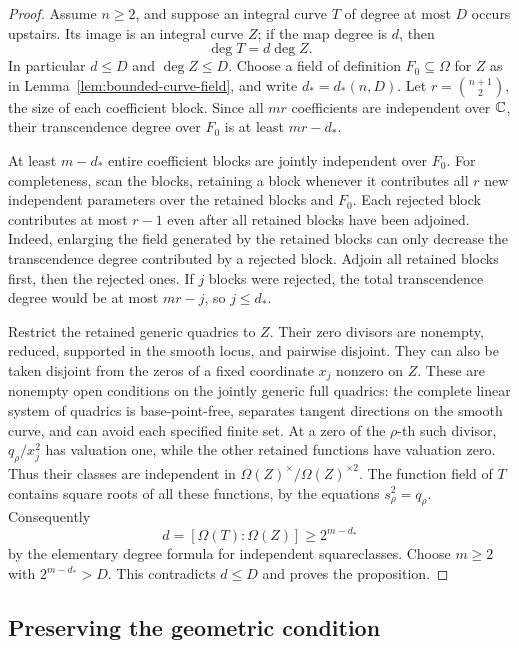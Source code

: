 \begin{proof}
Assume \(n\ge2\), and suppose an integral curve \(T\) of degree at
most \(D\) occurs upstairs. Its image is an integral curve \(Z\);
if the map degree is \(d\), then
\[
 \deg T=d\deg Z.
\]
In particular \(d\le D\) and \(\deg Z\le D\).
Choose a field of definition \(F_0\subseteq\Omega\) for \(Z\)
as in Lemma~\ref{lem:bounded-curve-field}, and write \(d_*=d_*(n,D)\).
Let \(r=\binom{n+1}{2}\), the size of each coefficient block.
Since all \(mr\) coefficients are independent over \(\mathbb C\),
their transcendence degree over \(F_0\) is at least \(mr-d_*\).

At least \(m-d_*\) entire coefficient blocks are jointly independent
over \(F_0\). For completeness, scan the blocks, retaining a block
whenever it contributes all \(r\) new independent parameters over
the retained blocks and \(F_0\). Each rejected block contributes at
most \(r-1\) even after all retained blocks have been adjoined.
Indeed, enlarging the field generated by the retained blocks can only
decrease the transcendence degree contributed by a rejected block.
Adjoin all retained blocks first, then the rejected ones.
If \(j\) blocks were rejected, the total transcendence degree would
be at most \(mr-j\), so \(j\le d_*\).

Restrict the retained generic quadrics to \(Z\).
Their zero divisors are nonempty, reduced, supported in the smooth
locus, and pairwise disjoint. They can also be taken disjoint from
the zeros of a fixed coordinate \(x_j\) nonzero on \(Z\).
These are nonempty open conditions on the jointly generic full
quadrics: the complete linear system of quadrics is base-point-free,
separates tangent directions on the smooth curve, and can avoid
each specified finite set. At a zero of the \(\rho\)-th such divisor,
\(q_\rho/x_j^2\) has valuation one, while the other retained
functions have valuation zero. Thus their classes are independent
in \(\Omega(Z)^\times/\Omega(Z)^{\times2}\).
The function field of \(T\) contains square roots of all these
functions, by the equations \(s_\rho^2=q_\rho\).
Consequently
\[
 d=[\Omega(T):\Omega(Z)]\ge2^{m-d_*}
\]
by the elementary degree formula for independent squareclasses.
Choose \(m\ge2\) with \(2^{m-d_*}>D\). This contradicts \(d\le D\)
and proves the proposition.
\end{proof}

\subsection{Preserving the geometric condition}


